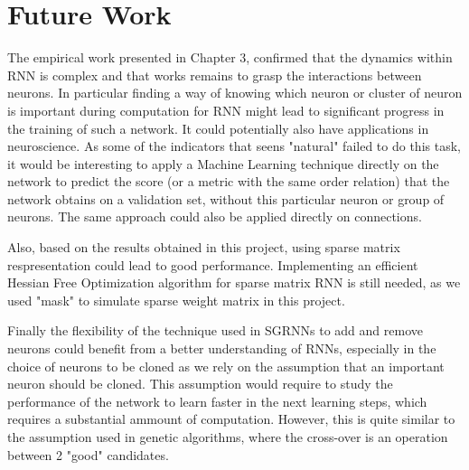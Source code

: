 \section{Future Work}

The empirical work presented in Chapter 3, confirmed that the dynamics within RNN is complex and that works remains to grasp the interactions between neurons. In particular finding a way of knowing which neuron or cluster of neuron is important during computation for RNN might lead to significant progress in the training of such a network. It could potentially also have applications in neuroscience. As some of the indicators that seens "natural" failed to do this task, it would be interesting to apply a Machine Learning technique directly on the network to predict the score (or a metric with the same order relation) that the network obtains on a validation set, without this particular neuron or group of neurons. The same approach could also be applied directly on connections. 

Also, based on the results obtained in this project, using sparse matrix respresentation could lead to good performance. Implementing an efficient Hessian Free Optimization algorithm for sparse matrix RNN is still needed, as we used "mask" to simulate sparse weight matrix in this project.

Finally the flexibility of the technique used in SGRNNs to add and remove neurons could benefit from a better understanding of RNNs, especially in the choice of neurons to be cloned as we rely on the assumption that an important neuron should be cloned. This assumption would require to study the performance of the network to learn faster in the next learning steps, which requires a substantial ammount of computation. However, this is quite similar to the assumption used in genetic algorithms, where the cross-over is an operation between 2 "good" candidates.    
